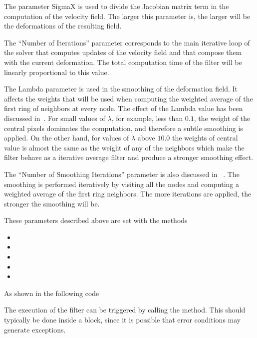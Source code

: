 \documentclass{InsightArticle}
\begin{document}
The parameter SigmaX is used to divide the Jacobian matrix term in the
computation of the velocity field. The larger this parameter is, the larger
will be the deformations of the resulting field.

The ``Number of Iterations'' parameter corresponds to the main iterative loop
of the solver that computes updates of the velocity field and that compose them
with the current deformation. The total computation time of the filter will be
linearly proportional to this value.

The Lambda parameter is used in the smoothing of the deformation field. It
affects the weights that will be used when computing the weighted average of
the first ring of neighbors at every node. The effect of the Lambda value has
been discussed in~\cite{MeshSmoothingIJ2009}. For small values of $\lambda$,
for example, less than $0.1$, the weight of the central pixels dominates the
computation, and therefore a subtle smoothing is applied. On the other hand,
for values of $\lambda$ above $10.0$ the weights of central value is almost the
same as the weight of any of the neighbors which make the filter behave as a
iterative average filter and produce a stronger smoothing effect.

The ``Number of Smoothing Iterations'' parameter is also discussed in
~\cite{MeshSmoothingIJ2009}. The smoothing is performed iteratively by visiting
all the nodes and computing a weighted average of the first ring neighbors. The
more iterations are applied, the stronger the smoothing will be.

These parameters described above are set with the methods

\begin{itemize}
\item {}
\item {}
\item {}
\item {}
\item {}
\end{itemize}

As shown in the following code

\begin{center}

\end{center}

The execution of the filter can be triggered by calling the 
method. This should typically be done inside a  block, since it
is possible that error conditions may generate exceptions.
\end{document}
